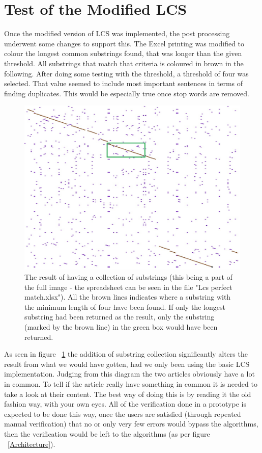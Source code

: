 \section{Test of the Modified LCS}

Once the modified version of LCS was implemented, the post processing underwent some changes to support this. The Excel printing was modified to colour the longest common substrings found, that was longer than the given threshold. All substrings that match that criteria is coloured in brown in the following. After doing some testing with the threshold, a threshold of four was selected. That value seemed to include most important sentences in terms of finding duplicates. This would be especially true once stop words are removed.

\begin{figure}
	\centering
	\includegraphics[scale=0.35]{figures/SubstringCollection}
	\caption{The result of having a collection of substrings (this being a part of the full image - the spreadsheet can be seen in the file "Lcs perfect match.xlsx"). All the brown lines indicates where a substring with the minimum length of four have been found. If only the longest substring had been returned as the result, only the substring (marked by the brown line) in the green box would have been returned.}
	\label{SubstringsEx}
\end{figure}

As seen in figure ~\ref{SubstringsEx} the addition of substring collection significantly alters the result from what we would have gotten, had we only been using the basic LCS implementation. Judging from this diagram the two articles obviously have a lot in common. To tell if the article really have something in common it is needed to take a look at their content. The best way of doing this is by reading it the old fashion way, with your own eyes.  All of the verification done in a prototype is expected to be done this way, once the users are satisfied (through repeated manual verification) that no or only very few errors would bypass the algorithms, then the verification would be left to the algorithms (as per figure ~\ref{Architecture}).

